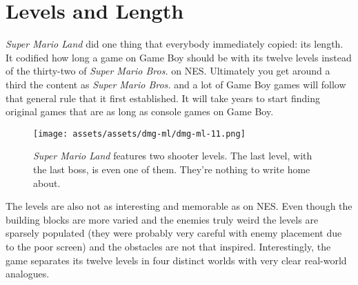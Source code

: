 \documentclass{book}
\let\oldcenter\center
\let\oldendcenter\endcenter
\renewenvironment{center}{\setlength\topsep{0pt}\oldcenter}{\oldendcenter}
\begin{document}
\FloatBarrier\needspace{5pt}\section*{Levels and Length}\nopagebreak[4]

\emph{Super Mario Land} did one thing that everybody immediately copied: its length. It codified how long a game on Game Boy should be with its twelve levels instead of the thirty-two of \emph{Super Mario Bros.} on NES. Ultimately you get around a third the content as \emph{Super Mario Bros.} and a lot of Game Boy games will follow that general rule that it first established. It will take years to start finding original games that are as long as console games on Game Boy.

\begin{figure}[hbt]
\vskip 10pt
\centering \texttt{[image: assets/assets/dmg-ml/dmg-ml-11.png]}\par\pagetwodescription \emph{Super Mario Land} features two shooter levels. The last level, with the last boss, is even one of them. They’re nothing to write home about.
\vskip 6pt
\end{figure}

The levels are also not as interesting and memorable as on NES. Even though the building blocks are more varied and the enemies truly weird the levels are sparsely populated (they were probably very careful with enemy placement due to the poor screen) and the obstacles are not that inspired. Interestingly, the game separates its twelve levels in four distinct worlds with very clear real-world analogues.

\begin{center}
\vspace{8pt}
\quad\vspace{4pt}
\quad\vspace{4pt}
\quad\vspace{4pt}
\end{center}
\end{document}
